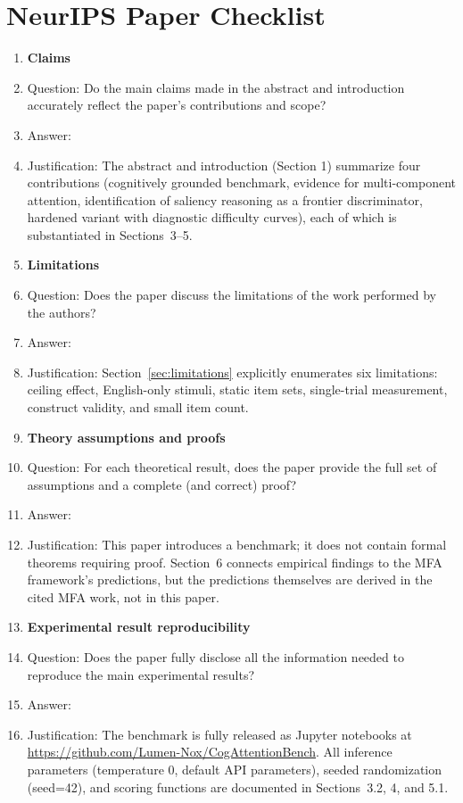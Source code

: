 \documentclass{article}
\begin{document}
\appendix

\section*{NeurIPS Paper Checklist}

\begin{enumerate}

\item \textbf{Claims}
    \item[] Question: Do the main claims made in the abstract and introduction accurately reflect the paper's contributions and scope?
    \item[] Answer: \answerYes{}
    \item[] Justification: The abstract and introduction (Section 1) summarize four contributions (cognitively grounded benchmark, evidence for multi-component attention, identification of saliency reasoning as a frontier discriminator, hardened variant with diagnostic difficulty curves), each of which is substantiated in Sections~3--5.

\item \textbf{Limitations}
    \item[] Question: Does the paper discuss the limitations of the work performed by the authors?
    \item[] Answer: \answerYes{}
    \item[] Justification: Section~\ref{sec:limitations} explicitly enumerates six limitations: ceiling effect, English-only stimuli, static item sets, single-trial measurement, construct validity, and small item count.

\item \textbf{Theory assumptions and proofs}
    \item[] Question: For each theoretical result, does the paper provide the full set of assumptions and a complete (and correct) proof?
    \item[] Answer: \answerNA{}
    \item[] Justification: This paper introduces a benchmark; it does not contain formal theorems requiring proof. Section~6 connects empirical findings to the MFA framework's predictions, but the predictions themselves are derived in the cited MFA work, not in this paper.

\item \textbf{Experimental result reproducibility}
    \item[] Question: Does the paper fully disclose all the information needed to reproduce the main experimental results?
    \item[] Answer: \answerYes{}
    \item[] Justification: The benchmark is fully released as Jupyter notebooks at \url{https://github.com/Lumen-Nox/CogAttentionBench}. All inference parameters (temperature 0, default API parameters), seeded randomization (seed=42), and scoring functions are documented in Sections~3.2, 4, and 5.1.


\end{enumerate}
\end{document}
